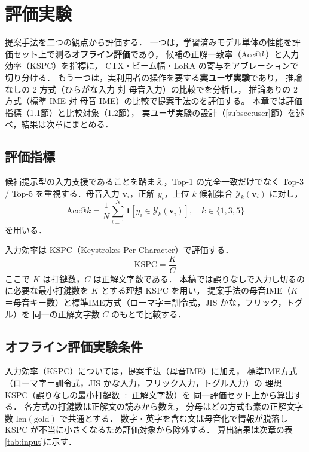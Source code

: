 \section{評価実験}

提案手法を二つの観点から評価する．
一つは，学習済みモデル単体の性能を評価セット上で測る\textbf{オフライン評価}であり，
候補の正解一致率（Acc@$k$）と入力効率（KSPC）を指標に，
CTX・ビーム幅・LoRA の寄与をアブレーションで切り分ける．
もう一つは，実利用者の操作を要する\textbf{実ユーザ実験}であり，
推論なしの 2 方式（ひらがな入力 対 母音入力）の比較でを分析し，
推論ありの 2 方式（標準 IME 対 母音 IME）の比較で提案手法のを評価する。
本章では評価指標（\ref{subsec:metrics}節）と比較対象（\ref{subsec:compare}節），
実ユーザ実験の設計（\ref{subsec:user}節）を述べ，結果は次章にまとめる．

\subsection{評価指標}
\label{subsec:metrics}
候補提示型の入力支援であることを踏まえ，Top-1 の完全一致だけでなく
Top-3 / Top-5 を重視する．母音入力 $\bm{v}_i$，正解 $y_i$，上位 $k$ 候補集合 $\mathcal{Y}_k(\bm{v}_i)$ に対し，
\begin{equation}
  \mathrm{Acc@}k = \frac{1}{N}\sum_{i=1}^{N}\mathbf{1}\!\left[y_i \in \mathcal{Y}_k(\bm{v}_i)\right],
  \quad k \in \{1,3,5\}
\end{equation}
を用いる．

入力効率は KSPC（Keystrokes Per Character）で評価する．
\begin{equation}
  \mathrm{KSPC} = \frac{K}{C}
\end{equation}
ここで $K$ は打鍵数，$C$ は正解文字数である．
本稿では誤りなしで入力し切るのに必要な最小打鍵数を $K$ とする理想 KSPC を用い，
提案手法の母音IME（$K$＝母音キー数）と標準IME方式（ローマ字＝訓令式，JIS かな，フリック，トグル）を
同一の正解文字数 $C$ のもとで比較する．

\subsection{オフライン評価実験条件}
\label{subsec:compare}
入力効率（KSPC）については，提案手法（母音IME）に加え，
標準IME方式（ローマ字＝訓令式，JIS かな入力，フリック入力，トグル入力）の
理想 KSPC（誤りなしの最小打鍵数 $\div$ 正解文字数）を
同一評価セット上から算出する．
各方式の打鍵数は正解文の読みから数え，
分母はどの方式も素の正解文字数 $\mathrm{len}(\text{gold})$ で共通とする．
数字・英字を含む文は母音化で情報が脱落し KSPC が不当に小さくなるため評価対象から除外する．
算出結果は次章の表\ref{tab:input}に示す．

